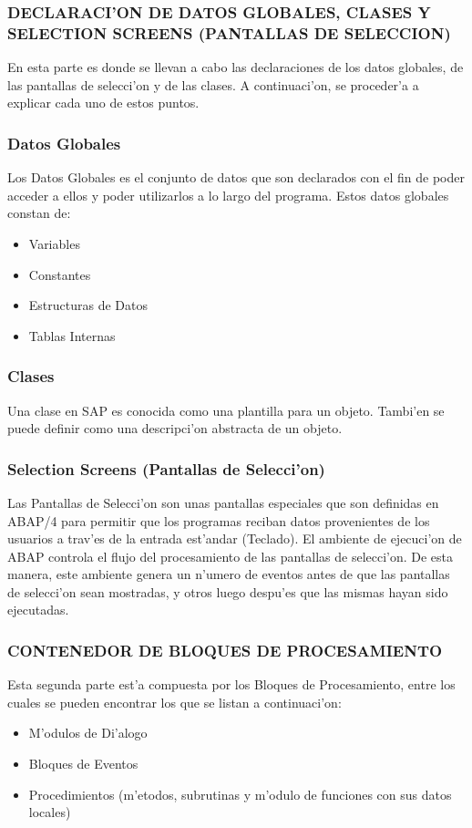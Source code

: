\subsubsection*{DECLARACI'ON DE DATOS GLOBALES, CLASES Y SELECTION SCREENS (PANTALLAS DE SELECCION)}
	En esta parte es donde se llevan a cabo las declaraciones de los datos globales, de las pantallas de selecci'on y de las clases. A continuaci'on, se proceder'a a explicar cada uno de estos puntos.
\subsubsection*{Datos Globales}
	Los Datos Globales es el conjunto de datos que son declarados con el fin de poder acceder a ellos y poder utilizarlos a lo largo del programa. Estos datos globales constan de:
\begin{itemize}
\item Variables
\item Constantes
\item Estructuras de Datos
\item Tablas Internas
\end{itemize}

\subsubsection*{Clases}
	Una clase en SAP es conocida como una plantilla para un objeto. Tambi'en se puede definir como una descripci'on abstracta de un objeto.

\subsubsection*{Selection Screens (Pantallas de Selecci'on)}
	Las Pantallas de Selecci'on son unas pantallas especiales que son definidas en ABAP/4 para permitir que los programas reciban datos provenientes de los usuarios a trav'es de la entrada est'andar (Teclado). El ambiente de ejecuci'on de ABAP controla el flujo del procesamiento de las pantallas de selecci'on. De esta manera, este ambiente genera un n'umero de eventos antes de que las pantallas de selecci'on sean mostradas, y otros luego despu'es que las mismas hayan sido ejecutadas.
	
\subsubsection*{CONTENEDOR DE BLOQUES DE PROCESAMIENTO}
	Esta segunda parte est'a compuesta por los Bloques de Procesamiento, entre los cuales se pueden encontrar los que se listan a continuaci'on:
\begin{itemize}
\item M'odulos de Di'alogo
\item Bloques de Eventos
\item Procedimientos (m'etodos, subrutinas y m'odulo de funciones con sus datos locales)
\end{itemize}

